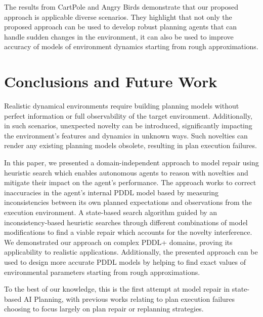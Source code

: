 \documentclass[letterpaper]{article} %
\begin{document}

The results from CartPole and Angry Birds demonstrate that our proposed approach is applicable diverse scenarios. They highlight that not only the proposed approach can be used to develop robust planning agents that can handle sudden changes in the environment, it can also be used to improve accuracy of models of environment dynamics starting from rough approximations. 

\section{Conclusions and Future Work}
Realistic dynamical environments require building planning models without perfect information or full observability of the target environment. Additionally, in such scenarios, unexpected novelty can be introduced, significantly impacting the environment's features and dynamics in unknown ways. Such novelties can render any existing planning models obsolete, resulting in plan execution failures.


In this paper, we presented a domain-independent approach to model repair using heuristic search which enables autonomous agents to reason with novelties and mitigate their impact on the agent's performance. The approach works to correct inaccuracies in the agent's internal PDDL model based by measuring inconsistencies between its own planned expectations and observations from the execution environment. A state-based search algorithm guided by an inconsistency-based heuristic searches through different combinations of model modifications to find a viable repair which accounts for the novelty interference. We demonstrated our approach on complex PDDL+ domains, proving its applicability to realistic applications. Additionally, the presented approach can be used to design more accurate PDDL models by helping to find exact values of environmental parameters starting from rough approximations. 

To the best of our knowledge, this is the first attempt at model repair in state-based AI Planning, with previous works relating to plan execution failures choosing to focus largely on plan repair or replanning strategies. 
\end{document}
